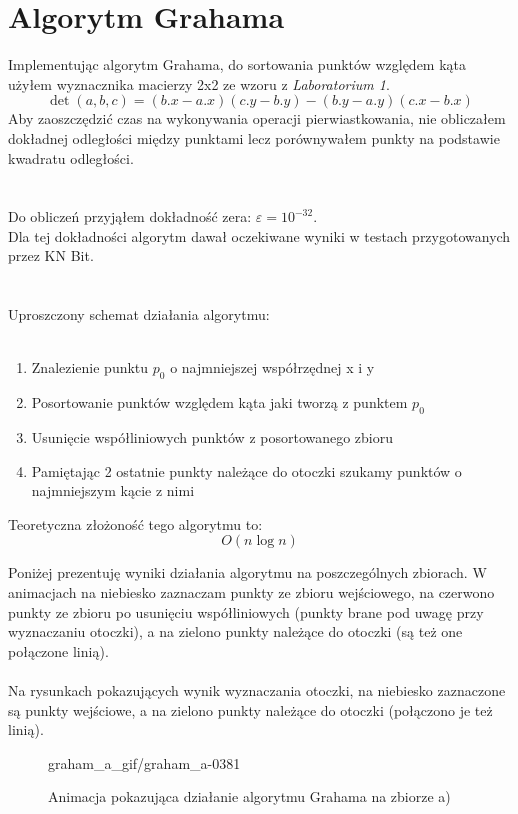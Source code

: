 \documentclass[a4paper]{article}
\begin{document}
\pagebreak
\section{Algorytm Grahama}
Implementując algorytm Grahama, do sortowania punktów względem kąta użyłem wyznacznika macierzy 2x2
ze wzoru z \textit{Laboratorium 1}.
\[
    \det{(a, b, c)} = (b.x - a.x)(c.y - b.y) - (b.y - a.y)(c.x - b.x)   
\]
Aby zaoszczędzić czas na wykonywania operacji pierwiastkowania, nie obliczałem dokładnej odległości między
punktami lecz porównywałem punkty na podstawie kwadratu odległości.
\\\\\\
Do obliczeń przyjąłem dokładność zera: $\varepsilon = 10^{-32}$.\\ 
Dla tej dokładności algorytm dawał oczekiwane wyniki w
 testach przygotowanych przez KN Bit.
\\\\\\
Uproszczony schemat działania algorytmu:\\\\

\begin{enumerate}
    \item Znalezienie punktu $p_0$ o najmniejszej współrzędnej x i y
    \item Posortowanie punktów względem kąta jaki tworzą z punktem $p_0$
    \item Usunięcie współliniowych punktów z posortowanego zbioru
    \item Pamiętając 2 ostatnie punkty należące do otoczki szukamy punktów o najmniejszym kącie z nimi
\end{enumerate}

Teoretyczna złożoność tego algorytmu to:
\[O(n\log n)\]

Poniżej prezentuję wyniki działania algorytmu na poszczególnych zbiorach. W animacjach na niebiesko zaznaczam
punkty ze zbioru wejściowego, na czerwono punkty ze zbioru po usunięciu współliniowych (punkty brane pod uwagę przy wyznaczaniu otoczki),
a na zielono punkty należące do otoczki (są też one połączone linią).\\\\ 
Na rysunkach pokazujących wynik wyznaczania otoczki, na niebiesko zaznaczone są punkty wejściowe, a na zielono
punkty należące do otoczki (połączono je też linią).

\begin{figure}[H]
    {graham_a_gif/graham_a-}{0}{381}
    \centering
    \caption{Animacja pokazująca działanie algorytmu Grahama na zbiorze a)}
    \label{fig:anim_graham_a}
\end{figure}
\end{document}
